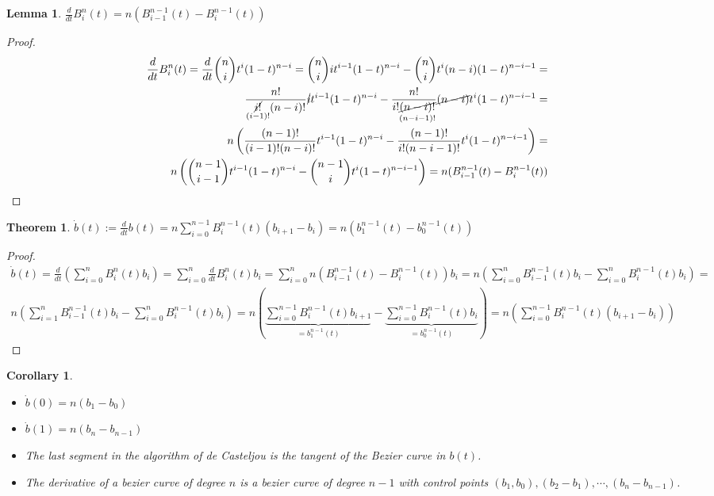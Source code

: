 \documentclass[]{article}
\newtheorem{lemma}{Lemma}
\newtheorem{theorem}{Theorem}
\newtheorem{corollary}{Corollary}
\begin{document}
\begin{lemma}
	$\frac{d}{dt}B_i^n(t) = n(B_{i-1}^{n-1}(t) - B_i^{n-1}(t))$
\end{lemma}

\begin{proof}
	\begin{align*}
		\frac{d}{dt}B_i^n(t) = \frac{d}{dt} \binom{n}{i} t^i (1-t)^{n-i} = \binom{n}{i} i t^{i-1} (1-t)^{n-i} - \binom{n}{i} t^i (n-i) (1-t)^{n-i-1} =\\
		\frac{n!}{\underset{(i-1)!}{\cancel{i!}}(n-i)!} \cancel{i} t^{i-1} (1-t)^{n-i} - \frac{n!}{i!\underset{(n-i-1)!}{\cancel{(n-i)!}}}\cancel{(n-i)}t^i (1-t)^{n-i-1} =\\
		n \left(\frac{(n-1)!}{(i-1)!(n-i)!}t^{i-1}(1-t)^{n-i} - \frac{(n-1)!}{i!(n-i-1)!} t^i (1-t)^{n-i-1}\right) =\\
		n \left(\binom{n-1}{i-1}t^{i-1}(1-t)^{n-i} - \binom{n-1}{i} t^i (1-t)^{n-i-1}\right) = n(B_{i-1}^{n-1}(t) - B_i^{n-1}(t))
	\end{align*}
\end{proof}

\begin{theorem}
	$\dot{b}(t) := \frac{d}{dt} b(t) = n \sum_{i=0}^{n-1} B_i^{n-1}(t)(b_{i+1} - b_i) = n (b_1^{n-1}(t) - b_0^{n-1}(t))$
\end{theorem}

\begin{proof}
	\begin{align*}
		\dot{b}(t) = \frac{d}{dt} \left(\sum_{i=0}^{n} B_i^n(t) b_i\right) = \sum_{i=0}^{n} \frac{d}{dt} B_i^n(t) b_i = \sum_{i=0}^{n} n(B_{i-1}^{n-1}(t) - B_i^{n-1}(t)) b_i = n \left(\sum_{i=0}^{n} B_{i-1}^{n-1}(t) b_i - \sum_{i=0}^{n} B_i^{n-1}(t) b_i\right) =\\
		n \left(\sum_{i=1}^{n} B_{i-1}^{n-1}(t) b_i - \sum_{i=0}^{n} B_i^{n-1}(t) b_i\right) = n\left(\underbrace{\sum_{i=0}^{n-1} B_i^{n-1}(t) b_{i+1}}_{=b_1^{n-1}(t)} - \underbrace{\sum_{i=0}^{n-1} B_i^{n-1}(t) b_i}_{=b_0^{n-1}(t)}\right) = n \left(\sum_{i=0}^{n-1} B_i^{n-1}(t)(b_{i+1} - b_i)\right)
	\end{align*}
\end{proof}

\begin{corollary}
	\begin{itemize}
		\item $\dot{b}(0) = n (b_1 - b_0)$
		\item $\dot{b}(1) = n (b_n - b_{n-1})$
		\item The last segment in the algorithm of de Casteljou is the tangent of the Bezier curve in $b(t)$.
		\item The derivative of a bezier curve of degree $n$ is a bezier curve of degree $n-1$ with control points $(b_1,b_0), (b_2 - b_1), \cdots, (b_n - b_{n-1})$.
	\end{itemize}
\end{corollary}
\end{document}
